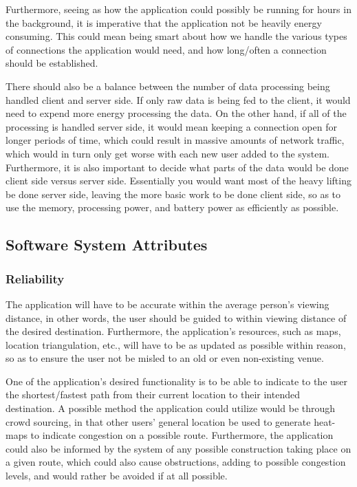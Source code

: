 \documentclass[12pt]{article}
\begin{document}
	

	Furthermore, seeing as how the application could possibly be running for hours in the background, it is imperative that the application not be heavily energy consuming.  This could mean being smart about how we handle the various types of connections the application would need, and how long/often a connection should be established.  

	

	There should also be a balance between the number of data processing being handled client and server side.  If only raw data is being fed to the client, it would need to expend more energy processing the data.  On the other hand, if all of the processing is handled server side, it would mean keeping a connection open for longer periods of time, which could result in massive amounts of network traffic, which would in turn only get worse with each new user added to the system.  Furthermore, it is also important to decide what parts of the data would be done client side versus server side.  Essentially you would want most of the heavy lifting be done server side, leaving the more basic work to be done client side, so as to use the memory, processing power, and battery power as efficiently as possible.   

	

	

	\subsection{Software System Attributes}

	

		\subsubsection{Reliability}

		The application will have to be accurate within the average person’s viewing distance, in other words, the user should be guided to within viewing distance of the desired destination.  Furthermore, the application’s resources, such as maps, location triangulation, etc., will have to be as updated as possible within reason, so as to ensure the user not be misled to an old or even non-existing venue.  

		

		One of the application’s desired functionality is to be able to indicate to the user the shortest/fastest path from their current location to their intended destination.  A possible method the application could utilize would be through crowd sourcing, in that other users’ general location be used to generate heat-maps to indicate congestion on a possible route.  Furthermore, the application could also be informed by the system of any possible construction taking place on a given route, which could also cause obstructions, adding to possible congestion levels, and would rather be avoided if at all possible.  
\end{document}
